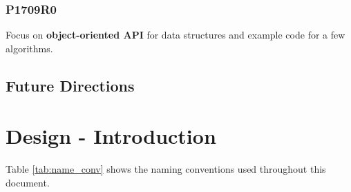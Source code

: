 \documentclass[10pt,onecolumn]{article}
\begin{document}
\subsubsection*{P1709R0}
Focus on \textbf{object-oriented API} for data structures and example code for a few algorithms.

\subsection{Future Directions}

\section{Design - Introduction}

Table \ref{tab:name_conv} shows the naming conventions used throughout this document. 
\end{document}
